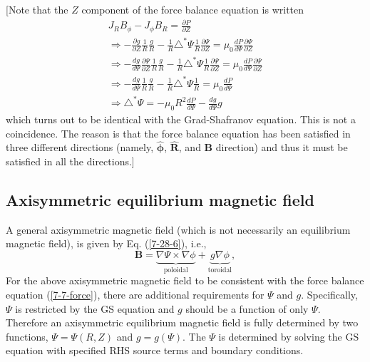 \documentclass{article}
\newcommand{\tmmathbf}[1]{\ensuremath{\boldsymbol{#1}}}
\newcommand{\tmop}[1]{\ensuremath{\operatorname{#1}}}
\begin{document}
[Note that the $Z$ component of the force balance equation is written
\[ \begin{array}{l}
     J_R B_{\phi} - J_{\phi} B_R = \frac{\partial P}{\partial Z}\\
     \Rightarrow - \frac{\partial g}{\partial Z} \frac{1}{R} \frac{g}{R} -
     \frac{1}{R} \triangle^{\ast} \Psi \frac{1}{R} \frac{\partial
     \Psi}{\partial Z} = \mu_0 \frac{d P}{d \Psi} \frac{\partial
     \Psi}{\partial Z}\\
     \Rightarrow - \frac{d g}{d \Psi} \frac{\partial \Psi}{\partial Z}
     \frac{1}{R} \frac{g}{R} - \frac{1}{R} \triangle^{\ast} \Psi \frac{1}{R}
     \frac{\partial \Psi}{\partial Z} = \mu_0 \frac{d P}{d \Psi}
     \frac{\partial \Psi}{\partial Z}\\
     \Rightarrow - \frac{d g}{d \Psi} \frac{1}{R} \frac{g}{R} - \frac{1}{R}
     \triangle^{\ast} \Psi \frac{1}{R} = \mu_0 \frac{d P}{d \Psi}\\
     \Rightarrow \triangle^{\ast} \Psi = - \mu_0 R^2 \frac{d P}{d \Psi} -
     \frac{d g}{d \Psi} g
   \end{array} \]
which turns out to be identical with the Grad-Shafranov equation. This is not
a coincidence. The reason is that the force balance equation has been
satisfied in three different directions (namely, $\hat{\tmmathbf{\phi}}$,
$\hat{\mathbf{R}}$, and $\mathbf{B}$ direction) and thus it must be satisfied
in all the directions.]

\subsection{Axisymmetric equilibrium magnetic field}

A general axisymmetric magnetic field (which is not necessarily an equilibrium
magnetic field), is given by Eq. (\ref{7-28-6}), i.e.,
\begin{equation}
  \label{4-15-p3} \mathbf{B}= \underbrace{\nabla \Psi \times \nabla
  \phi}_{\tmop{poloidal}} + \underbrace{g \nabla \phi}_{\tmop{toroidal}},
\end{equation}
For the above axisymmetric magnetic field to be consistent with the force
balance equation (\ref{7-7-force}), there are additional requirements for
$\Psi$ and $g$. Specifically, $\Psi$ is restricted by the GS equation and $g$
should be a function of only $\Psi$. Therefore an axisymmetric equilibrium
magnetic field is fully determined by two functions, $\Psi = \Psi (R, Z)$ and
$g = g (\Psi)$. The $\Psi$ is determined by solving the GS equation with
specified RHS source terms and boundary conditions.
\end{document}
